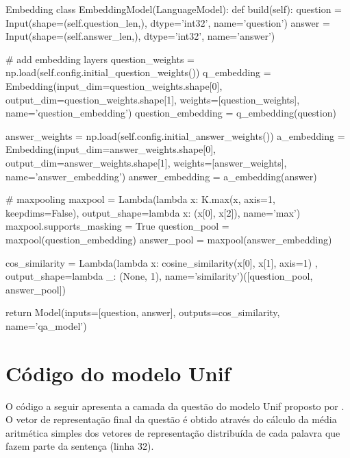 \begin{mypython-linenumber}{Embedding}
class EmbeddingModel(LanguageModel):
    def build(self):
        question = Input(shape=(self.question_len,), dtype='int32', name='question')
        answer = Input(shape=(self.answer_len,), dtype='int32', name='answer')

        # add embedding layers
        question_weights = np.load(self.config.initial_question_weights())
        q_embedding = Embedding(input_dim=question_weights.shape[0],
                                output_dim=question_weights.shape[1],
                                weights=[question_weights],
                                name='question_embedding')
        question_embedding = q_embedding(question)

        answer_weights = np.load(self.config.initial_answer_weights())
        a_embedding = Embedding(input_dim=answer_weights.shape[0],
                                output_dim=answer_weights.shape[1],
                                weights=[answer_weights],
                                name='answer_embedding')
        answer_embedding = a_embedding(answer)

        # maxpooling
        maxpool = Lambda(lambda x: K.max(x, axis=1, keepdims=False), output_shape=lambda x: (x[0], x[2]),
                         name='max')
        maxpool.supports_masking = True
        question_pool = maxpool(question_embedding)
        answer_pool = maxpool(answer_embedding)
        
        cos_similarity = Lambda(lambda x: cosine_similarity(x[0], x[1], axis=1)
                                       , output_shape=lambda _: (None, 1), name='similarity')([question_pool,
                                                                                               answer_pool])

        return Model(inputs=[question, answer], outputs=cos_similarity,
                                   name='qa_model')

\end{mypython-linenumber}

\vspace{2cm}

\section{Código do modelo Unif}

O código a seguir apresenta a camada da questão do modelo Unif proposto por \cite{cambronero-deep-learning-code-search:2019}. O vetor de representação final da questão é obtido através do cálculo da média aritmética simples dos vetores de representação distribuída de cada palavra que fazem parte da sentença (linha 32).

